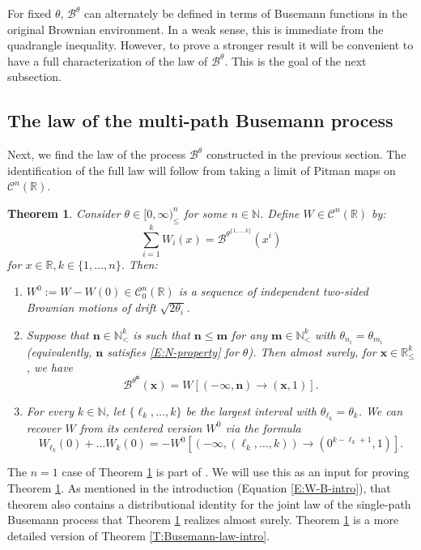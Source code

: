\documentclass[11pt]{article}
\newcommand{\N}{\mathbb{N}}
\newcommand{\R}{\mathbb{R}}
\newcommand{\cB}{\mathcal{B}}
\newcommand{\cC}{\mathcal{C}}
\newcommand{\bx}{\mathbf{x}}
\newcommand{\bn}{\mathbf{n}}
\newcommand{\bm}{\mathbf{m}}
\newtheorem{theorem}{Theorem}[section]
\theoremstyle{definition} %
\theoremstyle{remark} %
\begin{document}
For fixed $\theta$, $\cB^\theta$ can alternately be defined in terms of Busemann functions in the original  Brownian environment. In a weak sense, this is immediate from the quadrangle inequality. However, to prove a stronger result it will be convenient to have a full characterization of the law of $\cB^\theta$. This is the goal of the next subsection.

\subsection{The law of the multi-path Busemann process}

Next, we find the law of the process $\cB^\theta$ constructed in the previous section. The identification of the full law will follow from taking a limit of Pitman maps on $\cC^n(\R)$. 
\begin{theorem}
	\label{T:brownian-law}
	Consider $\theta \in [0, \infty)^n_\le$ for some $n \in \N$. Define $W \in \cC^n(\R)$ by:
	\begin{equation}
		\label{E:Wii-def}
\sum_{i=1}^k W_i(x) = \cB^{\theta^{\{1,\ldots,k\}}}(x^{i})
	\end{equation}
	for $x \in \R, k \in \{1, \dots, n\}$.
	 Then:
	\begin{enumerate}
		\item $W^0 := W - W(0) \in \cC^n_0(\R)$ is a sequence of independent two-sided Brownian motions  of drift $\sqrt{2\theta_i}$.
		\item Suppose that $\bn \in \N^k_<$ is such that $\bn \le \bm$ for any $\bm \in \N^k_<$ with $\theta_{n_i} = \theta_{m_i}$ (equivalently, $\bn$ satisfies \eqref{E:N-property} for $\theta$). Then almost surely, for $\bx \in \R^k_\le$, we have
		\begin{equation*}
			\cB^{\theta^{\bn}}(\bx) = W[(-\infty, \bn) \to (\bx, 1)].
		\end{equation*}
		\item For every $k \in \N$, let $\{\ell_k, \dots, k\}$ be the largest interval with $\theta_{\ell_k} = \theta_k$. We can recover $W$ from its centered version $W^0$ via the formula
		\begin{equation}
		\label{E:W-ellk}
			W_{\ell_k}(0) + \dots W_k(0) = - W^0[(-\infty, (\ell_k, \dots, k)) \to (0^{k-\ell_k + 1}, 1)].
		\end{equation}
	\end{enumerate}
\end{theorem}

The $n = 1$ case of Theorem \ref{T:brownian-law} is part of \cite[Theorem 3.7]{seppalainen2023global}. We will use this as an input for proving Theorem \ref{T:brownian-law}. As mentioned in the introduction (Equation \eqref{E:W-B-intro}), that theorem also contains a distributional identity for the joint law of the single-path Busemann process that Theorem \ref{T:brownian-law} realizes almost surely. Theorem \ref{T:brownian-law} is a more detailed version of Theorem \ref{T:Busemann-law-intro}.
\end{document}
